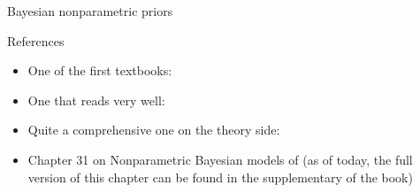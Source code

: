 \begin{frame}{Bayesian nonparametric priors}
\begin{center}
{\begin{center}
\flushright %
\citep{brix1999generalized}
\end{center}
}
\end{center}
\end{frame}





\begin{frame}{References}
\begin{itemize}
	\item \alert{One of the first textbooks}: 
	\item \alert{One that reads very well}: 
	\item \alert{Quite a comprehensive one on the theory side}: 
	\item \alert{Chapter 31} on Nonparametric Bayesian models of  (as of today, the full version of this chapter can be found in the supplementary of the book)
\end{itemize}
\end{frame}

